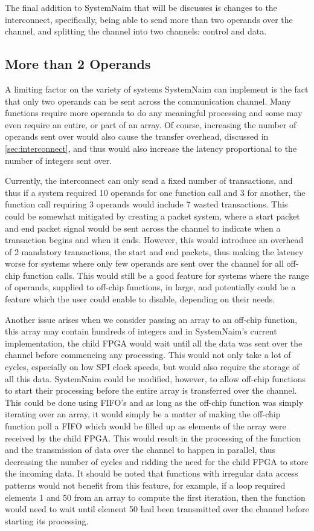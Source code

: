 The final addition to SystemNaim that will be discusses is changes to the interconnect, specifically, being able to send more than two operands over the channel, and splitting the channel into two channels: control and data.

\subsection{More than 2 Operands}

A limiting factor on the variety of systems SystemNaim can implement is the fact that only two operands can be sent across the communication channel. Many functions require more operands to do any meaningful processing and some may even require an entire, or part of an array. Of course, increasing the number of operands sent over would also cause the transfer overhead, discussed in \autoref{sec:interconnect}, and thus would also increase the latency proportional to the number of integers sent over. 

Currently, the interconnect can only send a fixed number of transactions, and thus if a system required 10 operands for one function call and 3 for another, the function call requiring 3 operands would include 7 wasted transactions. This could be somewhat mitigated by creating a packet system, where a start packet and end packet signal would be sent across the channel to indicate when a transaction begins and when it ends. However, this would introduce an overhead of 2 mandatory transactions, the start and end packets, thus making the latency worse for systems where only few operands are sent over the channel for all off-chip function calls. This would still be a good feature for systems where the range of operands, supplied to off-chip functions, in large, and potentially could be a feature which the user could enable to disable, depending on their needs.

Another issue arises when we consider passing an array to an off-chip function, this array may contain hundreds of integers and in SystemNaim's current implementation, the child FPGA would wait until all the data was sent over the channel before commencing any processing. This would not only take a lot of cycles, especially on low SPI clock speeds, but would also require the storage of all this data. SystemNaim could be modified, however, to allow off-chip functions to start their processing before the entire array is transferred over the channel. This could be done using FIFO's and as long as the off-chip function was simply iterating over an array, it would simply be a matter of making the off-chip function poll a FIFO which would be filled up as elements of the array were received by the child FPGA. This would result in the processing of the function and the transmission of data over the channel to happen in parallel, thus decreasing the number of cycles and ridding the need for the child FPGA to store the incoming data. It should be noted that functions with irregular data access patterns would not benefit from this feature, for example, if a loop required elements 1 and 50 from an array to compute the first iteration, then the function would need to wait until element 50 had been transmitted over the channel before starting its processing.


